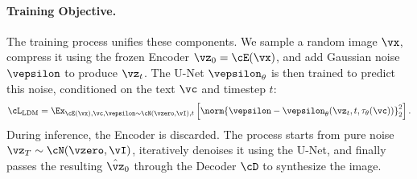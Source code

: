 \documentclass[../../book-main.tex]{subfiles}
\begin{document}
\paragraph{Training Objective.}
The training process unifies these components. We sample a random image \(\vx\), compress it using the frozen Encoder \(\vz_{0} = \cE(\vx)\), and add Gaussian noise \(\vepsilon\) to produce \(\vz_{t}\).
The U-Net \(\vepsilon_{\theta}\) is then trained to predict this noise, conditioned on the text \(\vc\) and timestep \(t\):
\begin{equation}
\cL_{\text{LDM}} = \Ex_{\cE(\vx), \vc, \vepsilon \sim \cN(\vzero, \vI), t} \left[ \norm{\vepsilon - \vepsilon_{\theta}(\vz_{t}, t, \tau_{\theta}(\vc))}_{2}^{2} \right] .
\end{equation}
During inference, the Encoder is discarded.
The process starts from pure noise \(\vz_{T} \sim \cN(\vzero, \vI)\), iteratively denoises it using the U-Net, and finally passes the resulting \(\hat{\vz}_{0}\) through the Decoder \(\cD\) to synthesize the image.
\end{document}
